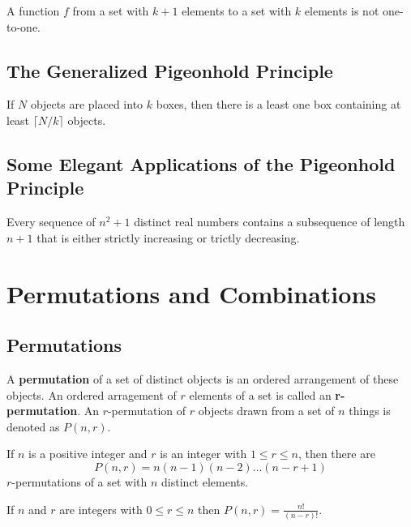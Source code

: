 \begin{corollary}
A function $f$ from a set with $k+1$ elements to a set with $k$ elements is not one-to-one.
\end{corollary}


    \subsection {The Generalized Pigeonhold Principle}
\begin{theorem}
If $N$ objects are placed into $k$ boxes, then there is a least one box containing at least $\lceil N/k \rceil$ objects.
\end{theorem}

    \subsection {Some Elegant Applications of the Pigeonhold Principle}
\begin{theorem}
Every sequence of $n^2 + 1$ distinct real numbers contains a subsequence of length $n+1$ that is either strictly increasing or trictly decreasing.
\end{theorem}

\section {Permutations and Combinations}
   
    \subsection {Permutations}
\begin{definition}
A \textbf{permutation} of a set of distinct objects is an ordered arrangement of these objects. An ordered arragement of $r$ elements of a set is called an \textbf{r-permutation}. An $r$-permutation of $r$ objects drawn from a set of $n$ things is denoted as $P(n,r)$.
\end{definition}

\begin{theorem}
If $n$ is a positive integer and $r$ is an integer with $1 \le r \le n$, then there are 
$$P(n,r) = n(n-1)(n-2) \dots (n-r+1)$$
$r$-permutations of a set with $n$ distinct elements.
\end{theorem}

\begin{corollary}
If $n$ and $r$ are integers with $0 \le r \le n$ then $P(n,r)=\frac{n!}{(n-r)!}$.
\end{corollary}



